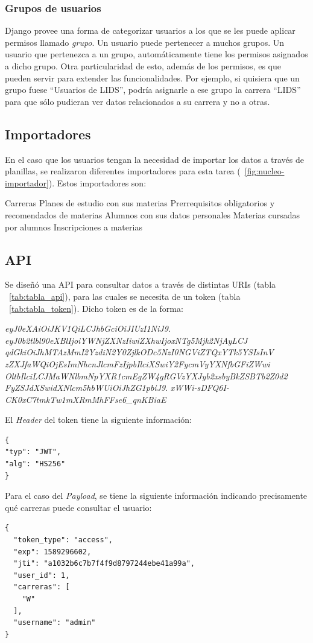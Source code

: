 \subsubsection{Grupos de usuarios}

Django provee una forma de categorizar usuarios a los que se les puede aplicar permisos llamado \textit{grupo}. Un usuario puede pertenecer a muchos grupos.
Un usuario que pertenezca a un grupo, automáticamente tiene los permisos asignados a dicho grupo.
Otra particularidad de esto, además de los permisos, es que pueden servir para extender las funcionalidades. Por ejemplo, si quisiera que un grupo fuese “Usuarios de LIDS”, podría asignarle a ese grupo la carrera “LIDS” para que sólo pudieran ver datos relacionados a su carrera y no a otras.


\subsection{Importadores}

En el caso que los usuarios tengan la necesidad de importar los datos a través de planillas, se realizaron diferentes importadores para esta tarea (~\ref{fig:nucleo-importador}).
Estos importadores son:
\begin{outline}
\2 Carreras
\2 Planes de estudio con sus materias
\2 Prerrequisitos obligatorios y recomendados de materias
\2 Alumnos con sus datos personales
\2 Materias cursadas por alumnos
\2 Inscripciones a materias
\end{outline}

\subsection{API}

Se diseñó una API para consultar datos a través de distintas URIs (tabla ~\ref{tab:tabla_api}), para las cuales se necesita de un token (tabla ~\ref{tab:tabla_token}).
Dicho token es de la forma:

\textit{eyJ0eXAiOiJKV1QiLCJhbGciOiJIUzI1NiJ9.} \break 
\textit{eyJ0b2tlbl90eXBlIjoiYWNjZXNzIiwiZXhwIjoxNTg5Mjk2NjAyLCJ}\break 
\textit{qdGkiOiJhMTAzMmI2YzdiN2Y0ZjlkODc5NzI0NGViZTQxYTk5YSIsInV}\break 
\textit{zZXJfaWQiOjEsImNhcnJlcmFzIjpbIlciXSwiY2FycmVyYXNfbGFiZWwi} \break \textit{OltbIlciLCJMaWNlbmNpYXR1cmEgZW4gRGVzYXJyb2xsbyBkZSBTb2Z0d2}\break 
\textit{FyZSJdXSwidXNlcm5hbWUiOiJhZG1pbiJ9}.\break 
\textit{xWWi-sDFQ6I-CK0xC7tmkTw1mXRmMhFFse6\_qnKBiaE}

\break
El \textit{Header} del token tiene la siguiente información:
\begin{verbatim}
{
"typ": "JWT",
"alg": "HS256"
}
\end{verbatim}
\break
Para el caso del \textit{Payload}, se tiene la siguiente información indicando precisamente qué carreras puede consultar el usuario:
\begin{verbatim}
{
  "token_type": "access",
  "exp": 1589296602,
  "jti": "a1032b6c7b7f4f9d8797244ebe41a99a",
  "user_id": 1,
  "carreras": [
    "W"
  ],
  "username": "admin"
}
\end{verbatim}

